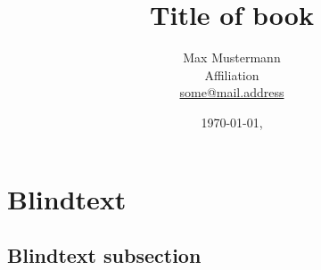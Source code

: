 \documentclass[
11pt,
bibliography=totoc,
numbers=noenddot,
]{scrbook}
\title{Title of book}
\author{Max Mustermann \\
  Affiliation \\
  \url{some@mail.address} \\}
\date{\ddmmyyyydate\today, \currenttime}
\begin{document}
\maketitle
\frontmatter
\tableofcontents
\mainmatter



\chapter{Blindtext}

\lipsum

\section{Blindtext subsection}

\lipsum



\insertBib
\end{document}
